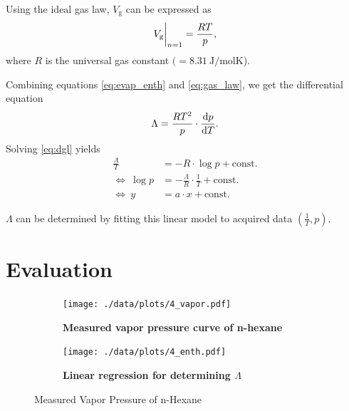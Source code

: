 Using the ideal gas law, $V_\text{g}$ can be expressed as
\begin{equation}\label{eq:gas_law}
	V_\text{g}\at[\bigg]{n=1}=\frac{RT}{p},
\end{equation}
where $R$ is the universal gas constant $(=\SI{8.31}{\joule\per\mole\kelvin}$).

Combining equations \ref{eq:evap_enth} and \ref{eq:gas_law}, we get the differential equation
\begin{equation}\label{eq:dgl}
	\Lambda=\frac{RT^2}{p}\cdot\frac{\d p}{\d T}.
\end{equation}
Solving \autoref{eq:dgl} yields
\begin{align}
	\frac{\Lambda}{T}&=-R\cdot\log{p}+\text{const.} \nonumber \\
	\Leftrightarrow\ \log{p}&=-\frac{\Lambda}{R}\cdot \frac{1}{T} + \text{const.}	\label{eq:fit_eq} \\
	\Leftrightarrow\ y&=a\cdot x + \text{const.} \nonumber
\end{align}

$\Lambda$ can be determined by fitting this linear model to acquired data $(\frac{1}{T},p)$.

\section{Evaluation}
\begin{figure}[tbp]
	\centering
	\begin{subfigure}{0.4\textwidth}
		\centering
		\texttt{[image: ./data/plots/4\_vapor.pdf]}
		\caption{\textbf{Measured vapor pressure curve of n-hexane}}
		\label{subfig:press_curve_meas}
	\end{subfigure}
	\begin{subfigure}{0.4\textwidth}
		\centering
		\texttt{[image: ./data/plots/4\_enth.pdf]}
		\caption{\textbf{Linear regression for determining $\Lambda$}}
		\label{subfig:lambda_meas}
	\end{subfigure}
	\caption{Measured Vapor Pressure of n-Hexane}
\end{figure}

